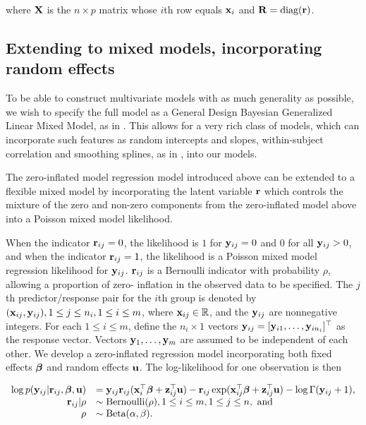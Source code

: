 \noindent where ${\bf X}$ is the $n\times p$ matrix whose $i$th row equals ${\bf x}_i$ and ${\bf R} = \text{diag}{({\bf r})}$.

\subsection{Extending to mixed models, incorporating random effects}

To be able to construct multivariate models with as much generality as possible, we wish to specify the full
model as a General Design Bayesian Generalized Linear Mixed Model, as in \cite{Zhao2006}. This allows for a
very rich class of models, which can incorporate such features as random intercepts and slopes, within-subject
correlation and smoothing splines, as in \cite{Wand2008}, into our models.

The zero-inflated model regression model introduced above can be extended to a flexible mixed model by
incorporating the latent variable ${\bf r}$ which controls the mixture of the zero and non-zero components from
the zero-inflated model above into a Poisson mixed model likelihood.

When the indicator ${\bf r}_{ij} = 0$, the likelihood is $1$ for ${\bf y}_{ij} = 0$ and $0$ for all ${\bf y}_{ij} > 0$,
and when the indicator ${\bf r}_{ij} = 1$, the likelihood is a Poisson mixed model regression likelihood for
${\bf y}_{ij}$. ${\bf r}_{ij}$ is a Bernoulli indicator with probability $\rho$, allowing a proportion of zero-
inflation in the observed data to be specified. The $j$th predictor/response pair for the $i$th group is
denoted by $({\bf x}_{ij}, {\bf y}_{ij}), 1 \leq j \leq n_i, 1 \leq i \leq m$, where ${\bf x}_{ij} \in {\mathbb{R}}$, and the
${\bf y}_{ij}$ are nonnegative integers. For each $1 \leq i \leq m$, define the $n_i \times 1$ vectors ${\bf y}_{ij} =
[{\bf y}_{i 1}, \ldots, {\bf y}_{i n_i}]^\top$ as the response vector. Vectors ${\bf y}_1, \ldots, {\bf y}_m$ are assumed to
be independent of each other.  We develop a zero-inflated regression model incorporating both fixed effects
${\boldsymbol \beta}$ and random effects ${\bf u}$. The log-likelihood for one observation is then

$$
	\begin{array}{rl}
		\log p({\bf y}_{ij} | {\bf r}_{ij}, {\boldsymbol \beta}, {\bf u}) & = {\bf y}_{ij} {\bf r}_{ij} ({\bf x}_i^\top {\boldsymbol\beta} + {\bf z}_{ij}^\top {\bf u}) - {\bf r}_{ij} \exp ({\bf x}_{ij}^\top {\boldsymbol\beta} + {\bf z}_{ij}^\top {\bf u}) - \log \Gamma ({\bf y}_{ij} + 1), \\
		{\bf r}_{ij} | \rho                  & \sim \text{Bernoulli}(\rho), 1 \leq i \leq m, 1 \leq j \leq n, \text{ and }                                                              \\
		\rho                        & \sim \text{Beta}(\alpha, \beta).                                                                                              \\
	\end{array}
$$

